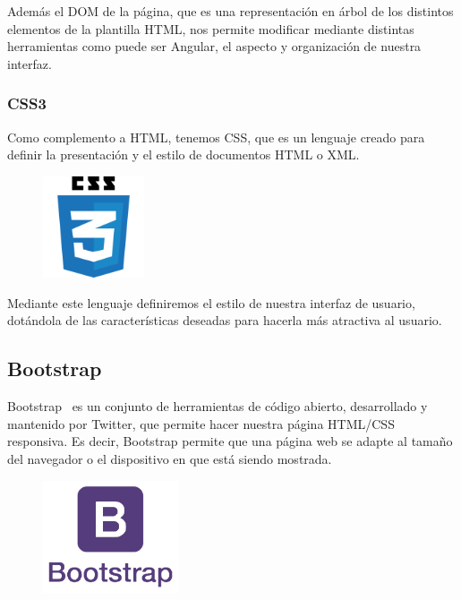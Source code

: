 \documentclass[a4paper, spanish, 12pt]{book}
\begin{document}
Adem\'as el DOM de la p\'agina, que es una representaci\'on en \'arbol de los distintos
elementos de la plantilla HTML, nos permite modificar mediante distintas herramientas
como puede ser Angular, el aspecto y organizaci\'on de nuestra interfaz.

\subsubsection*{CSS3}
\label{subsec:css3}

Como complemento a HTML, tenemos CSS, que es un lenguaje creado para definir la presentaci\'on
y el estilo de documentos HTML o XML.

\begin{figure}[H]
  \centering
  \includegraphics[width=3cm, keepaspectratio]{img/css3-logo}
\end{figure}

Mediante este lenguaje definiremos el estilo de nuestra interfaz de usuario, dot\'andola
de las caracter\'isticas deseadas para hacerla m\'as atractiva al usuario.

\subsection{Bootstrap}
\label{subsec:bootstrap}

Bootstrap~\cite{bootstrap} es un conjunto de herramientas de c\'odigo abierto, desarrollado y mantenido
por Twitter, que permite hacer nuestra p\'agina HTML/CSS responsiva. Es decir,
Bootstrap permite que una página web se adapte al tama\~no del navegador o el dispositivo en que
está siendo mostrada.

\begin{figure}[H]
  \centering
  \includegraphics[width=4cm, keepaspectratio]{img/bootstrap-logo}
\end{figure}
\end{document}
